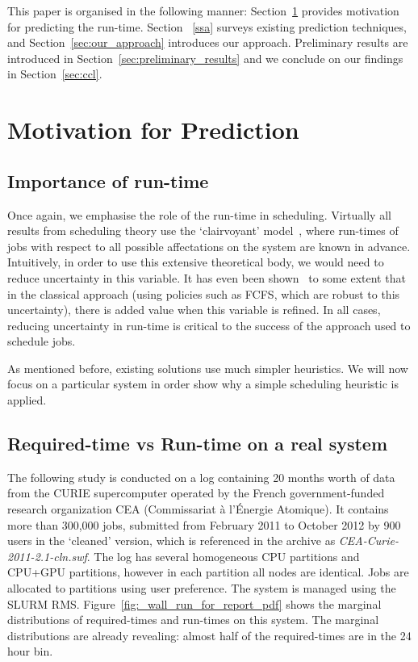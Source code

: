 \documentclass{article}
\begin{document}
This paper is organised in the following manner: Section~\ref{motiv} provides motivation for predicting the run-time. Section ~\ref{ssa} surveys existing prediction techniques, and Section~\ref{sec:our_approach} introduces our approach. Preliminary results are introduced in Section~\ref{sec:preliminary_results} and we conclude on our findings in Section~\ref{sec:ccl}.

\section{Motivation for Prediction}
\label{motiv}

\subsection{Importance of run-time}
\label{sub:importance_of_run-time}
Once again, we emphasise the role of the run-time in scheduling. Virtually all results from scheduling theory use the `clairvoyant' model~\cite{handbook-of-scheduling}, where run-times of jobs with respect to all possible affectations on the system are known in advance.
Intuitively, in order to use this extensive theoretical body, we would need to reduce uncertainty in this variable.
It has even been shown~\cite{tsafir} to some extent that in the classical approach (using policies such as FCFS, which are robust to this uncertainty), there is added value when this variable is refined.
In all cases, reducing uncertainty in run-time is critical to the success of the approach used to schedule jobs.

As mentioned before, existing solutions use much simpler heuristics. We will now focus on a particular system in order show why a simple scheduling heuristic is applied.

\subsection{Required-time vs Run-time on a real system}
\label{sub:required-time_vs_run-time_on_a_real_system}
The following study is conducted on a log containing 20 months worth of data from the CURIE supercomputer operated by the French government-funded research organization CEA (Commissariat à l'Énergie Atomique).
It contains more than 300,000 jobs, submitted from February 2011 to October 2012 by 900 users in the `cleaned' version, which is referenced in the archive as \textit{CEA-Curie-2011-2.1-cln.swf}.
The log has several homogeneous CPU partitions and CPU+GPU partitions, however in each partition all nodes are identical.
Jobs are allocated to partitions using user preference. The system is managed using the SLURM RMS.
Figure~\ref{fig:_wall_run_for_report_pdf} shows the marginal distributions of required-times and run-times on this system. The marginal distributions are already revealing: almost half of the required-times are in the 24 hour bin.
\end{document}

